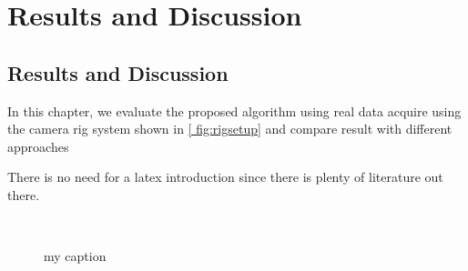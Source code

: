 \chapter{Results and Discussion}
\label{chapter:Results and Discussion}



 
\section{Results and Discussion}
In this chapter, we evaluate the proposed algorithm using real data acquire using 
the camera rig system shown in \ref{ fig:rigsetup} and compare result with different 
approaches 



There is no need for a latex introduction since there is plenty of literature out there.


\begin{figure}
\begin{adjustwidth}{-1in}{-1in} 
\centering     %
{}
 \\
\caption{my caption}
\end{adjustwidth}
\end{figure}


